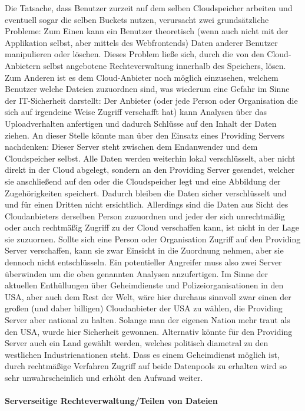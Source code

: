 \documentclass[13pt,a4paper,bibliography=totocnumbered,listof=totocnumbered]{scrartcl}
\begin{document}
Die Tatsache, dass Benutzer zurzeit auf dem selben Cloudspeicher arbeiten und eventuell sogar die selben Buckets nutzen, verursacht zwei grundsätzliche Probleme: Zum Einen kann ein Benutzer theoretisch (wenn auch nicht mit der Applikation selbst, aber mittels des Webfrontends) Daten anderer Benutzer manipulieren oder löschen. Dieses Problem ließe sich, durch die von den Cloud-Anbietern selbst angebotene Rechteverwaltung innerhalb des Speichers, lösen. Zum Anderen ist es dem Cloud-Anbieter noch möglich einzusehen, welchem Benutzer welche Dateien zuzuordnen sind, was wiederum eine Gefahr im Sinne der IT-Sicherheit darstellt: Der Anbieter (oder jede Person oder Organisation die sich auf irgendeine Weise Zugriff verschafft hat) kann Analysen über das Uploadverhalten anfertigen und dadurch Schlüsse auf den Inhalt der Daten ziehen. An dieser Stelle könnte man über den Einsatz eines Providing Servers nachdenken: Dieser Server steht zwischen dem Endanwender und dem Cloudspeicher selbst. Alle Daten werden weiterhin lokal verschlüsselt, aber nicht direkt in der Cloud abgelegt, sondern an den Providing Server gesendet, welcher sie anschließend auf den oder die Cloudspeicher legt und eine Abbildung der Zugehörigkeiten speichert. Dadurch bleiben die Daten sicher verschlüsselt und und für einen Dritten nicht ersichtlich. Allerdings sind die Daten aus Sicht des Cloudanbieters derselben Person zuzuordnen und jeder der sich unrechtmäßig oder auch rechtmäßig Zugriff zu der Cloud verschaffen kann, ist nicht in der Lage sie zuzuornen. Sollte sich eine Person oder Organisation Zugriff auf den Providing Server verschaffen, kann sie zwar Einsicht in die Zuordnung nehmen, aber sie dennoch nicht entschlüsseln. Ein potentieller Angreifer muss also zwei Server überwinden um die oben genannten Analysen anzufertigen. Im Sinne der aktuellen Enthüllungen über Geheimdienste und Polizeiorganisationen in den USA, aber auch dem Rest der Welt, wäre hier durchaus sinnvoll zwar einen der großen (und daher billigen) Cloudanbieter der USA zu wählen, die Providing Server aber national zu halten. Solange man der eigenen Nation mehr traut als den USA, wurde hier Sicherheit gewonnen. Alternativ könnte für den Providing Server auch ein Land gewählt werden, welches politisch diametral zu den westlichen Industrienationen steht. Dass es einem Geheimdienst möglich ist, durch rechtmäßige Verfahren Zugriff auf beide Datenpools zu erhalten wird so sehr unwahrscheinlich und erhöht den Aufwand weiter.\\
\\\textbf{Serverseitige Rechteverwaltung/Teilen von Dateien}\\
\end{document}
